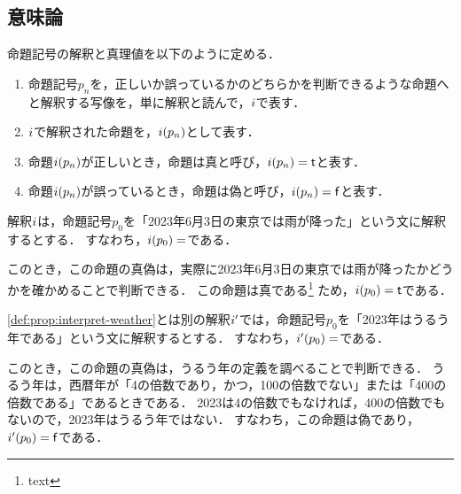 \subsection{意味論}

\begin{myDefinition}[命題記号の解釈と真理値]
  \label{def:prop:interpret-props}
  命題記号の解釈と真理値を以下のように定める．
  \begin{enumerate}
    \item 命題記号$p_n$を，正しいか誤っているかのどちらかを判断できるような命題へと解釈する写像を，単に解釈と読んで，$i$で表す．
    \item $i$で解釈された命題を，$i(p_n)$として表す．
    \item 命題$i(p_n)$が正しいとき，命題は真と呼び，$i(p_n) = \mathsf{t}$と表す．
    \item 命題$i(p_n)$が誤っているとき，命題は偽と呼び，$i(p_n) = \mathsf{f}$と表す．
  \end{enumerate}
\end{myDefinition}

\begin{myExample}
  \label{def:prop:interpret-weather}
  解釈$i$は，命題記号$p_0$を「2023年6月3日の東京では雨が降った」という文に解釈するとする．
  すなわち，$i(p_0) =$である．

  このとき，この命題の真偽は，実際に2023年6月3日の東京では雨が降ったかどうかを確かめることで判断できる．
  この命題は真である\footnote{text}
  ため，$i(p_0) = \mathsf{t}$である．
\end{myExample}

\begin{myExample}
  \label{def:prop:leapyear}
  \ref{def:prop:interpret-weather}とは別の解釈$i'$では，命題記号$p_0$を「2023年はうるう年である」という文に解釈するとする．
  すなわち，$i'(p_0) =$である．

  このとき，この命題の真偽は，うるう年の定義を調べることで判断できる．
  うるう年は，西暦年が「4の倍数であり，かつ，100の倍数でない」または「400の倍数である」であるときである．
  2023は4の倍数でもなければ，400の倍数でもないので，2023年はうるう年ではない．
  すなわち，この命題は偽であり，$i'(p_0) = \mathsf{f}$である．
\end{myExample}

